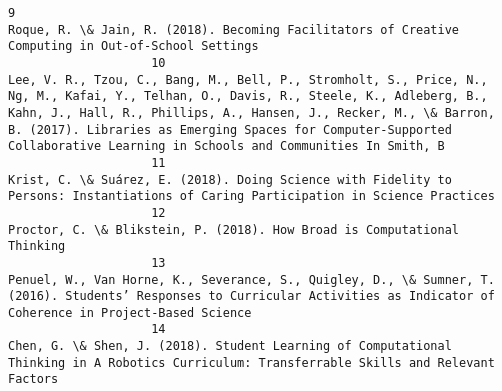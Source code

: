 \documentclass[journal,twocolumn]{IEEEtran}
\begin{document}
\begin{Verbatim}[commandchars=\\\{\}]
                    9                                                                                                                                                                                                                                                                                                                            Roque, R. \& Jain, R. (2018). Becoming Facilitators of Creative Computing in Out-of-School Settings
                    10                                                                                     Lee, V. R., Tzou, C., Bang, M., Bell, P., Stromholt, S., Price, N., Ng, M., Kafai, Y., Telhan, O., Davis, R., Steele, K., Adleberg, B., Kahn, J., Hall, R., Phillips, A., Hansen, J., Recker, M., \& Barron, B. (2017). Libraries as Emerging Spaces for Computer-Supported Collaborative Learning in Schools and Communities In Smith, B
                    11                                                                                                                                                                                                                                                                                           Krist, C. \& Suárez, E. (2018). Doing Science with Fidelity to Persons: Instantiations of Caring Participation in Science Practices
                    12                                                                                                                                                                                                                                                                                                                                                      Proctor, C. \& Blikstein, P. (2018). How Broad is Computational Thinking
                    13                                                                                                                                                                                                                                                 Penuel, W., Van Horne, K., Severance, S., Quigley, D., \& Sumner, T. (2016). Students’ Responses to Curricular Activities as Indicator of Coherence in Project-Based Science 
                    14                                                                                                                                                                                                                                                                                   Chen, G. \& Shen, J. (2018). Student Learning of Computational Thinking in A Robotics Curriculum: Transferrable Skills and Relevant Factors

\end{Verbatim}
\end{document}
